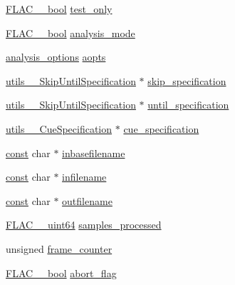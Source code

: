 \begin{DoxyCompactItemize}
\begin{tabbing}
\end{tabbing}\item 
\hyperlink{ordinals_8h_a95103469f1cbd78b8cf250194985b34e}{F\+L\+A\+C\+\_\+\+\_\+bool} \hyperlink{struct_decoder_session_ab3fd442a827a6b06b5006f9bd3a8c668}{test\+\_\+only}
\item 
\hyperlink{ordinals_8h_a95103469f1cbd78b8cf250194985b34e}{F\+L\+A\+C\+\_\+\+\_\+bool} \hyperlink{struct_decoder_session_a4052e10ebd4e30942f850ff3a8a6ad7a}{analysis\+\_\+mode}
\item 
\hyperlink{structanalysis__options}{analysis\+\_\+options} \hyperlink{struct_decoder_session_aee9b4057b5ed3c689576e44e86ffc0ed}{aopts}
\item 
\hyperlink{structutils_____skip_until_specification}{utils\+\_\+\+\_\+\+Skip\+Until\+Specification} $\ast$ \hyperlink{struct_decoder_session_aad06b0ffa3a3a9cdfc92dad48ff41860}{skip\+\_\+specification}
\item 
\hyperlink{structutils_____skip_until_specification}{utils\+\_\+\+\_\+\+Skip\+Until\+Specification} $\ast$ \hyperlink{struct_decoder_session_ae891e1c86136bec8b288cd5d48b3e7ce}{until\+\_\+specification}
\item 
\hyperlink{structutils_____cue_specification}{utils\+\_\+\+\_\+\+Cue\+Specification} $\ast$ \hyperlink{struct_decoder_session_a8d6ac7a2818dacfae1341d781cb2f6dc}{cue\+\_\+specification}
\item 
\hyperlink{getopt1_8c_a2c212835823e3c54a8ab6d95c652660e}{const} char $\ast$ \hyperlink{struct_decoder_session_ac8a697c59955faa644b7384e4e64f209}{inbasefilename}
\item 
\hyperlink{getopt1_8c_a2c212835823e3c54a8ab6d95c652660e}{const} char $\ast$ \hyperlink{struct_decoder_session_aad0779eb8507f71616c3712b9d255e54}{infilename}
\item 
\hyperlink{getopt1_8c_a2c212835823e3c54a8ab6d95c652660e}{const} char $\ast$ \hyperlink{struct_decoder_session_a66264c51e4cb1c8afcd925cc82d22418}{outfilename}
\item 
\hyperlink{ordinals_8h_aa78c8c70a3eb8a58af7436f278acde8e}{F\+L\+A\+C\+\_\+\+\_\+uint64} \hyperlink{struct_decoder_session_a5c1a39de00d6fb941e92e67a8c83ee9f}{samples\+\_\+processed}
\item 
unsigned \hyperlink{struct_decoder_session_a146f9da6b91d9939135223afa7a1c5df}{frame\+\_\+counter}
\item 
\hyperlink{ordinals_8h_a95103469f1cbd78b8cf250194985b34e}{F\+L\+A\+C\+\_\+\+\_\+bool} \hyperlink{struct_decoder_session_a89f7322f0fd8d5492bd63401acf37cb1}{abort\+\_\+flag}

\end{DoxyCompactItemize}
